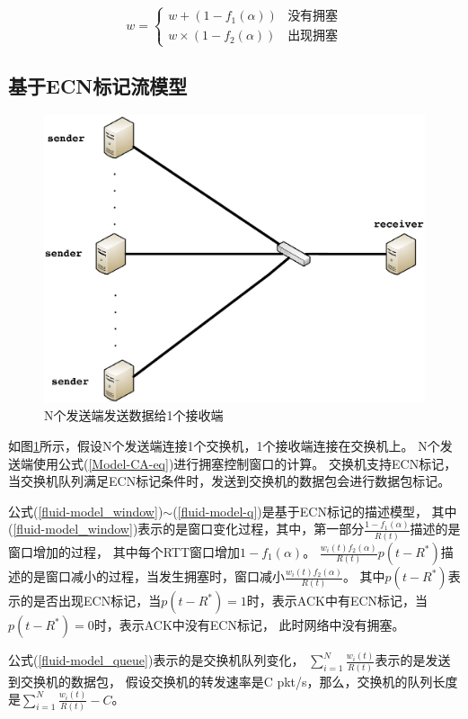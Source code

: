 \begin{equation}
w=
\begin{cases}
w+(1-f_1(\alpha)) &\text{没有拥塞}\\
w \times (1-f_2(\alpha)) &\text{出现拥塞}
\end{cases}
\label{Model-CA-eq}
\end{equation}

\subsection{基于ECN标记流模型}\label{cha:model:introduction}
\begin{figure}[H] 
  \centering
  \includegraphics[width=0.9\columnwidth]{figures/others/senders.eps}
  \caption{N个发送端发送数据给1个接收端}
  \label{model-senders-fig}
\end{figure}

如图\ref{model-senders-fig}所示，假设N个发送端连接1个交换机，1个接收端连接在交换机上。
N个发送端使用公式(\ref{Model-CA-eq})进行拥塞控制窗口的计算。
交换机支持ECN标记，当交换机队列满足ECN标记条件时，发送到交换机的数据包会进行数据包标记。

公式(\ref{fluid-model_window})$\sim$(\ref{fluid-model-q})是基于ECN标记的描述模型，
其中(\ref{fluid-model_window})表示的是窗口变化过程，其中，第一部分$\frac{1-f_1(\alpha)}{R(t)}$描述的是窗口增加的过程，
其中每个RTT窗口增加$1-f_1(\alpha)$。
$\frac{w_i(t)f_2(\alpha)}{R(t)}p(t-R^*)$描述的是窗口减小的过程，当发生拥塞时，窗口减小$\frac{w_i(t)f_2(\alpha)}{R(t)}$。
其中$p(t-R^*)$表示的是否出现ECN标记，当$p(t-R^*)=1$时，表示ACK中有ECN标记，当$p(t-R^*)=0$时，表示ACK中没有ECN标记，
此时网络中没有拥塞。

公式(\ref{fluid-model_queue})表示的是交换机队列变化，
$ \sum_{i=1}^N{\frac{w_i(t)}{R(t)}}$表示的是发送到交换机的数据包，
假设交换机的转发速率是C pkt/s，那么，交换机的队列长度是$\sum_{i=1}^N{\frac{w_i(t)}{R(t)}}-C \label{fluid-model_queue}$。

